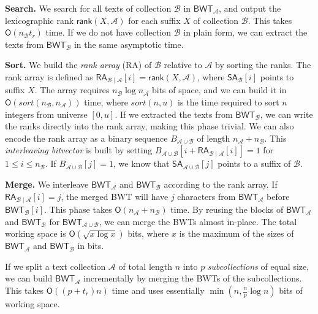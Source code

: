 \documentclass[smallabstract,smallcaptions]{dccpaper}
\newcommand{\Oh}{\ensuremath{\mathsf{O}}}
\newcommand{\BWT}{\textsf{BWT}}
\newcommand{\RA}{\textsf{RA}}
\newcommand{\mSA}{\ensuremath{\mathsf{SA}}}
\newcommand{\mBWT}{\ensuremath{\mathsf{BWT}}}
\newcommand{\mRA}{\ensuremath{\mathsf{RA}}}
\newcommand{\mrank}{\ensuremath{\mathsf{rank}}}
\newcommand{\Acoll}{\ensuremath{\mathcal{A}}}
\newcommand{\Bcoll}{\ensuremath{\mathcal{B}}}
\begin{document}
\smallbreak\noindent\textbf{Search.} We search for all texts of collection $\Bcoll$ in $\mBWT_{\Acoll}$, and output the lexicographic rank $\mrank(X, \Acoll)$ for each suffix $X$ of collection $\Bcoll$. This takes $\Oh(n_{\Bcoll} t_{r})$ time. If we do not have collection $\Bcoll$ in plain form, we can extract the texts from $\mBWT_{\Bcoll}$ in the same asymptotic time.

\smallbreak\noindent\textbf{Sort.} We build the \emph{rank array} (\RA) of $\Bcoll$ relative to $\Acoll$ by sorting the ranks. The rank array is defined as $\mRA_{\Bcoll \mid \Acoll}[i] = \mrank(X, \Acoll)$, where $\mSA_{\Bcoll}[i]$ points to suffix $X$. The array requires $n_{\Bcoll} \log n_{\Acoll}$ bits of space, and we can build it in $\Oh(sort(n_{\Bcoll}, n_{\Acoll}))$ time, where $sort(n, u)$ is the time required to sort $n$ integers from universe $[0,u]$. If we extracted the texts from $\mBWT_{\Bcoll}$, we can write the ranks directly into the rank array, making this phase trivial. We can also encode the rank array as a binary sequence $B_{\Acoll \cup \Bcoll}$ of length $n_{\Acoll} + n_{\Bcoll}$. This \emph{interleaving bitvector} is built by setting $B_{\Acoll \cup \Bcoll}[i + \mRA_{\Bcoll \mid \Acoll}[i]] = 1$ for $1 \le i \le n_{\Bcoll}$. If $B_{\Acoll \cup \Bcoll}[j] = 1$, we know that $\mSA_{\Acoll \cup \Bcoll}[j]$ points to a suffix of $\Bcoll$.

\smallbreak\noindent\textbf{Merge.} We interleave $\mBWT_{\Acoll}$ and $\mBWT_{\Bcoll}$ according to the rank array. If $\mRA_{\Bcoll \mid \Acoll}[i] = j$, the merged \BWT{} will have $j$ characters from $\mBWT_{\Acoll}$ before $\mBWT_{\Bcoll}[i]$. This phase takes $\Oh(n_{\Acoll} + n_{\Bcoll})$ time. By reusing the blocks of $\mBWT_{\Acoll}$ and $\mBWT_{\Bcoll}$ for $\mBWT_{\Acoll \cup \Bcoll}$, we can merge the \BWT{}s almost in-place. The total working space is $\Oh(\sqrt{x \log x})$ bits, where $x$ is the maximum of the sizes of $\mBWT_{\Acoll}$ and $\mBWT_{\Bcoll}$ in bits.


\Section{Large-scale \BWT{} merging}

If we split a text collection $\Acoll$ of total length $n$ into $p$ \emph{subcollections} of equal size, we can build $\mBWT_{\Acoll}$ incrementally by merging the \BWT{}s of the subcollections. This takes $\Oh((p+t_{r})n)$ time and uses essentially $\min(n, \frac{n}{p} \log n)$ bits of working space.
\end{document}
